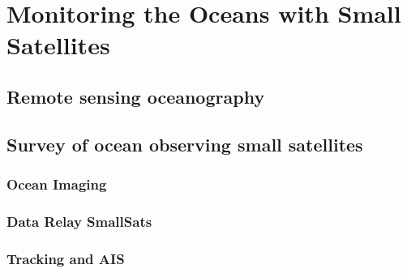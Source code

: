 %
%
%


\chapter{Monitoring the Oceans with Small Satellites}
\label{chp:Oceanography}


\section{Remote sensing oceanography}
\label{sec:Oceanography_RemoteSensing}

\lipsum


\section{Survey of ocean observing small satellites}
\label{sec:Oceanography_SmallSatSurvey}

\lipsum

\subsection{Ocean Imaging}
\label{subsec:Ocean_Imaging}

\lipsum

\subsection{Data Relay SmallSats}
\label{subsec:Data_Relay}

\lipsum

\subsection{Tracking and AIS}
\label{subsec:AIS}

